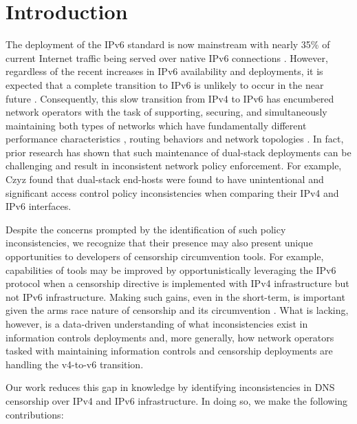 \section{Introduction}\label{sec:intro}

The deployment of the IPv6 standard is now mainstream with nearly 35\% of
current Internet traffic being served over native IPv6 connections
\cite{Google-IPv6}. However, regardless of the recent increases in IPv6
availability and deployments, it is expected that a complete transition to IPv6
is unlikely to occur in the near future \cite{Prince-CF2021, Huston-APNIC2021}.
%
Consequently, this slow transition from IPv4 to IPv6 has encumbered network
operators with the task of supporting, securing, and simultaneously
maintaining both types of networks which have fundamentally different
performance characteristics \cite{perf}, routing behaviors and network
topologies \cite{topo}.
%
In fact, prior research has shown that such maintenance of dual-stack
deployments can be challenging and result in inconsistent network policy
enforcement.
%
For example, Czyz \etal \cite{Czyz-NDSS2016} found that dual-stack end-hosts
were found to have unintentional and significant access control policy
inconsistencies when comparing their IPv4 and IPv6 interfaces. 

Despite the concerns prompted by the identification of such policy
inconsistencies, we recognize that their presence may also present unique
opportunities to developers of censorship circumvention tools. For example,
capabilities of tools may be improved by opportunistically leveraging the IPv6
protocol when a censorship directive is implemented with IPv4 infrastructure
but not IPv6 infrastructure.
%
Making such gains, even in the short-term, is important given the arms race
nature of censorship and its circumvention \cite{reactive}.
%
What is lacking, however, is a data-driven understanding of what
inconsistencies exist in information controls deployments and, more generally,
how network operators tasked with maintaining information controls and
censorship deployments are handling the v4-to-v6 transition. 

Our work reduces this gap in knowledge by identifying inconsistencies in DNS
censorship over IPv4 and IPv6 infrastructure. In doing so, we make the
following contributions:

